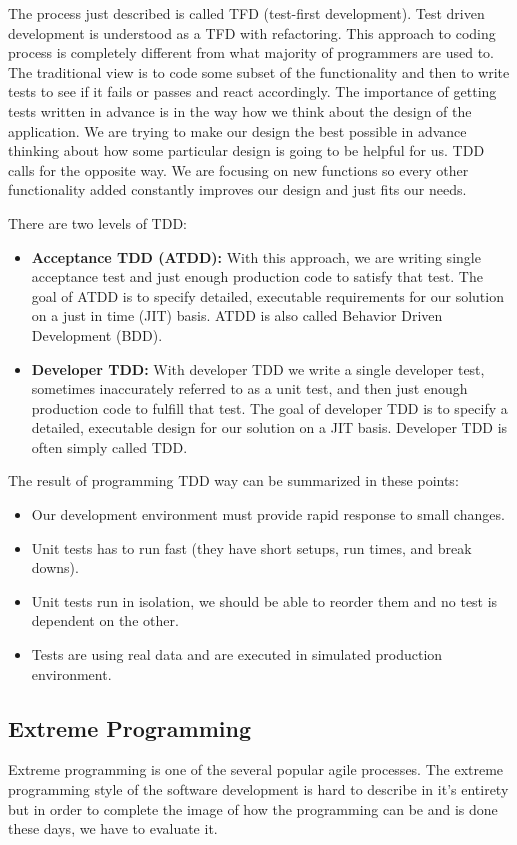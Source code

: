 \documentclass[12pt,final,oneside]{fithesis}
\begin{document}
The process just described is called TFD (test-first development). Test driven development is understood as a TFD with refactoring. This approach to coding process is completely different from what majority of programmers are used to. The traditional view is to code some subset of the functionality and then to write tests to see if it fails or passes and react accordingly. The importance of getting tests written in advance is in the way how we think about the design of the application. We are trying to make our design the best possible in advance thinking about how some particular design is going to be helpful for us. TDD calls for the opposite way. We are focusing on new functions so every other functionality added constantly improves our design and just fits our needs.

\newpage
There are two levels of TDD:

\begin{itemize}
	\item{\textbf{Acceptance TDD (ATDD):}} With this approach, we are writing single acceptance test and just enough production code to satisfy that test. The goal of ATDD is to specify detailed, executable requirements for our solution on a just in time (JIT) basis. ATDD is also called Behavior Driven Development (BDD).
	\item{\textbf{Developer TDD:}} With developer TDD we write a single developer test, sometimes inaccurately referred to as a unit test, and then just enough production code to fulfill that test. The goal of developer TDD is to specify a detailed, executable design for our solution on a JIT basis.  Developer TDD is often simply called TDD.
\end{itemize}

The result of programming TDD way can be summarized in these points:

\begin{itemize}
	\item{Our development environment must provide rapid response to small changes.}
	\item{Unit tests has to run fast (they have short setups, run times, and break downs).}
	\item{Unit tests run in isolation, we should be able to reorder them and no test is dependent on the other.}
	\item{Tests are using real data and are executed in simulated production environment.}
\end{itemize}	

	\subsection{Extreme Programming}
Extreme programming is one of the several popular agile processes. The extreme programming style of the software development is hard to describe in it's entirety but in order to complete the image of how the programming can be and is done these days, we have to evaluate it.
\end{document}
